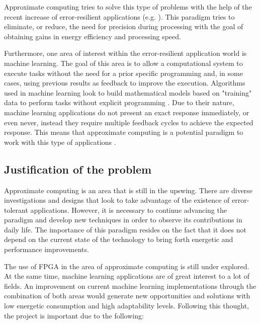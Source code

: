Approximate computing tries to solve this type of problems with the help of the recent increase of error-resilient
applications (e.g. \cite{errortolerant}). This paradigm tries to eliminate, or reduce, the need for precision
during processing with the goal of obtaining gains in energy efficiency and processing speed.

Furthermore, one area of interest within the error-resilient application world is machine learning.
The goal of this area is to allow a computational system to execute tasks without the need for a prior
specific programming and, in some cases, using previous results as feedback to improve the execution.
Algorithms used in machine learning look to build mathematical models based on "training" data to perform
tasks without explicit programming \cite{patternrecogbook}. Due to their nature, machine learning applications do not present
an exact response immediately, or even never, instead they require multiple feedback cycles to achieve
the expected response. This means that approximate computing is a potential paradigm to work with this
type of applications \cite{approximatecomp}.

\subsection{Justification of the problem}

Approximate computing is an area that is still in the upswing. There are diverse investigations and designs
that look to take advantage of the existence of error-tolerant applications. However, it is necessary to
continue advancing the paradigm and develop new techniques in order to observe its contributions in daily
life. The importance of this paradigm resides on the fact that it does not depend on the current state
of the technology to bring forth energetic and performance improvements.

The use of FPGA in the area of approximate computing is still under explored. At the same time, machine
learning applications are of great interest to a lot of fields. An improvement on current machine learning
implementations through the combination of both areas would generate new opportunities and solutions
with low energetic consumption and high adaptability levels. Following this thought, the project is
important due to the following:

